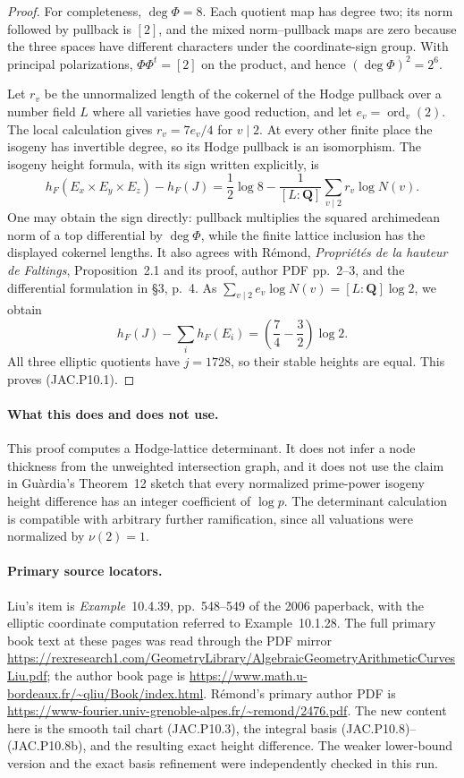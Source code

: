 \begin{proof}
For completeness, $\deg\Phi=8$. Each quotient map has degree two;
its norm followed by pullback is $[2]$, and the mixed norm--pullback
maps are zero because the three spaces have different characters
under the coordinate-sign group. With principal polarizations,
$\Phi\Phi^t=[2]$ on the product, and hence
$(\deg\Phi)^2=2^6$.

Let $r_v$ be the unnormalized length of the cokernel of the Hodge
pullback over a number field $L$ where all varieties have good
reduction, and let $e_v=\operatorname{ord}_v(2)$.
The local calculation gives $r_v=7e_v/4$ for $v\mid2$.
At every other finite place the isogeny has invertible degree,
so its Hodge pullback is an isomorphism.
The isogeny height formula, with its sign written explicitly, is
\[
 h_F(E_x\times E_y\times E_z)-h_F(J)
 =\frac12\log8-
   \frac1{[L:\mathbf Q]}\sum_{v\mid2} r_v\log N(v).
                                                        \tag{JAC.P10.9}
\]
One may obtain the sign directly: pullback multiplies the squared
archimedean norm of a top differential by $\deg\Phi$, while the
finite lattice inclusion has the displayed cokernel lengths.
It also agrees with R\'emond, \emph{Propri\'et\'es de la hauteur
de Faltings}, Proposition~2.1 and its proof, author PDF pp.~2--3,
and the differential formulation in \S3, p.~4.
As $\sum_{v\mid2}e_v\log N(v)=[L:\mathbf Q]\log2$, we obtain
\[
 h_F(J)-\sum_i h_F(E_i)
 =\left(\frac74-\frac32\right)\log2.
\]
All three elliptic quotients have $j=1728$, so their stable heights
are equal. This proves (JAC.P10.1).
\end{proof}

\paragraph{What this does and does not use.}
This proof computes a Hodge-lattice determinant.
It does not infer a node thickness from the unweighted intersection
graph, and it does not use the claim in Gu\`ardia's Theorem~12 sketch
that every normalized prime-power isogeny height difference has an
integer coefficient of $\log p$. The determinant calculation is
compatible with arbitrary further ramification, since all valuations
were normalized by $\nu(2)=1$.

\paragraph{Primary source locators.}
Liu's item is \emph{Example}~10.4.39, pp.~548--549 of the 2006
paperback, with the elliptic coordinate computation referred to
Example~10.1.28. The full primary book text at these pages was read
through the PDF mirror
\url{https://rexresearch1.com/GeometryLibrary/AlgebraicGeometryArithmeticCurvesLiu.pdf};
the author book page is
\url{https://www.math.u-bordeaux.fr/~qliu/Book/index.html}.
R\'emond's primary author PDF is
\url{https://www-fourier.univ-grenoble-alpes.fr/~remond/2476.pdf}.
The new content here is the smooth tail chart (JAC.P10.3), the
integral basis (JAC.P10.8)--(JAC.P10.8b), and the resulting exact
height difference. The weaker lower-bound version and the exact
basis refinement were independently checked in this run.
